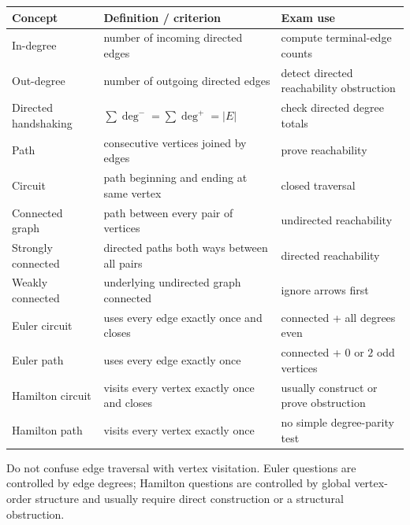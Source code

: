 \begin{center}
\small
\begin{tabular}{@{}p{}p{}p{}@{}}
\toprule
\textbf{Concept} & \textbf{Definition / criterion} & \textbf{Exam use} \\
\midrule
In-degree & number of incoming directed edges & compute terminal-edge counts \\
Out-degree & number of outgoing directed edges & detect directed reachability obstruction \\
Directed handshaking & \(\sum\deg^-=\sum\deg^+=|E|\) & check directed degree totals \\
Path & consecutive vertices joined by edges & prove reachability \\
Circuit & path beginning and ending at same vertex & closed traversal \\
Connected graph & path between every pair of vertices & undirected reachability \\
Strongly connected & directed paths both ways between all pairs & directed reachability \\
Weakly connected & underlying undirected graph connected & ignore arrows first \\
Euler circuit & uses every edge exactly once and closes & connected + all degrees even \\
Euler path & uses every edge exactly once & connected + \(0\) or \(2\) odd vertices \\
Hamilton circuit & visits every vertex exactly once and closes & usually construct or prove obstruction \\
Hamilton path & visits every vertex exactly once & no simple degree-parity test \\
\bottomrule
\end{tabular}
\end{center}

\begin{commonmistake}[title={Final warning for Handout 08}]
Do not confuse edge traversal with vertex visitation. Euler questions are controlled by edge degrees; Hamilton questions are controlled by global vertex-order structure and usually require direct construction or a structural obstruction.
\end{commonmistake}